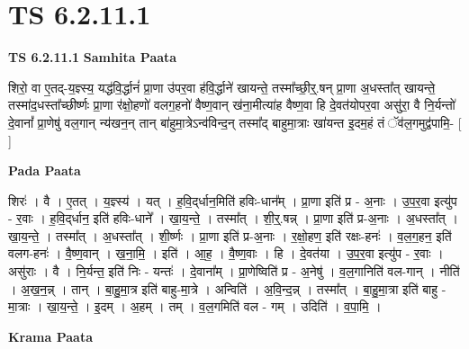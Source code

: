 \documentclass[17pt]{extarticle}
\begin{document}
\section{ TS 6.2.11.1 }

\textbf{TS 6.2.11.1 } \newline
\textbf{Samhita Paata} \newline

शिरो॒ वा ए॒तद्-य॒ज्ञ्स्य॒ यद्ध॑वि॒र्द्धानं॑ प्रा॒णा उ॑पर॒वा ह॑वि॒र्द्धाने॑ खायन्ते॒ तस्मा᳚च्छी॒र्॒.षन् प्रा॒णा अ॒धस्ता᳚त् खायन्ते॒ तस्मा॑द॒धस्ता᳚च्छीर्ष्णः प्रा॒णा र॑क्षो॒हणो॑ वलग॒हनो॑ वैष्ण॒वान् ख॑ना॒मीत्या॑ह वैष्ण॒वा हि दे॒वत॑योपर॒वा असु॑रा॒ वै नि॒र्यन्तो॑ दे॒वानां᳚ प्रा॒णेषु॑ वल॒गान् न्य॑खन॒न् तान् बा॑हुमा॒त्रेऽन्व॑विन्द॒न् तस्मा᳚द् बाहुमा॒त्राः खा॑यन्त इ॒दम॒हं तं ॅव॑ल॒गमुद्व॑पामि॒- [  ] \newline

\textbf{Pada Paata} \newline

शिरः॑ । वै । ए॒तत् । य॒ज्ञ्स्य॑ । यत् । ह॒वि॒द्‌र्धान॒मिति॑ हविः-धान᳚म् । प्रा॒णा इति॑ प्र - अ॒नाः । उ॒प॒र॒वा इत्यु॑प - र॒वाः । ह॒वि॒द्‌र्धान॒ इति॑ हविः-धाने᳚ । खा॒य॒न्ते॒ । तस्मा᳚त् । शी॒र्॒.षन्न् । प्रा॒णा इति॑ प्र-अ॒नाः । अ॒धस्ता᳚त् । खा॒य॒न्ते॒ । तस्मा᳚त् । अ॒धस्ता᳚त् । शी॒र्ष्णः । प्रा॒णा इति॑ प्र-अ॒नाः । र॒क्षो॒हण॒ इति॑ रक्षः-हनः॑ । व॒ल॒ग॒हन॒ इति॑ वलग-हनः॑ । वै॒ष्ण॒वान् । ख॒ना॒मि॒ । इति॑ । आ॒ह॒ । वै॒ष्ण॒वाः । हि । दे॒वत॑या । उ॒प॒र॒वा इत्यु॑प - र॒वाः । असु॑राः । वै । नि॒र्यन्त॒ इति॑ निः - यन्तः॑ । दे॒वाना᳚म् । प्रा॒णेष्विति॑ प्र - अ॒नेषु॑ । व॒ल॒गानिति॑ वल-गान् । नीति॑ । अ॒ख॒न॒न्न् । तान् । बा॒हु॒मा॒त्र इति॑ बाहु-मा॒त्रे । अन्विति॑ । अ॒वि॒न्द॒न्न् । तस्मा᳚त् । बा॒हु॒मा॒त्रा इति॑ बाहु - मा॒त्राः । खा॒य॒न्ते॒ । इ॒दम् । अ॒हम् । तम् । व॒ल॒गमिति॑ वल - गम् । उदिति॑ । व॒पा॒मि॒ ।  \newline


\textbf{Krama Paata} \newline
\end{document}
